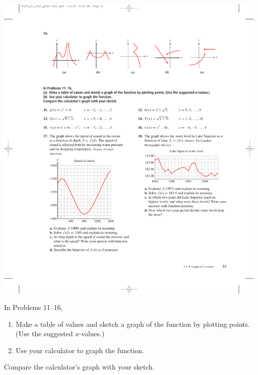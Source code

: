 \documentclass[10pt,]{book}
\theoremstyle{plain}
\theoremstyle{definition}
\theoremstyle{definition}
\theoremstyle{definition}
\theoremstyle{definition}
\numberwithin{equation}{part}
\begin{document}
\begin{exercisegroup}
\exercise[10.]\hypertarget{exercise-167}{}\includegraphics[width=1\linewidth]{images/fig-ex-1-3-10}
%
\end{exercisegroup}
\par\smallskip\noindent
\hypertarget{exercisegroup-18}{}\par\noindent In Problems 11–16, \leavevmode%
\begin{enumerate}[label=*\alph**]
\item\hypertarget{li-714}{}Make a table of values and sketch a graph of the function by plotting points. (Use the suggested \(x\)-values.)%
\item\hypertarget{li-715}{}Use your calculator to graph the function.%
\end{enumerate}
 Compare the calculator's graph with your sketch.%
\end{document}
